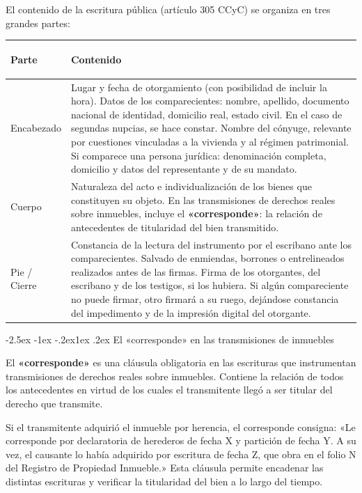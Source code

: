 \documentclass[12pt,oneside]{book}
\makeatletter
\renewcommand\subsection{\@startsection{subsection}{2}{\z@}%
  {-2.5ex \@plus -1ex \@minus -.2ex}{1ex \@plus .2ex}%
  {\normalfont\normalsize\bfseries}}
\makeatother
\begin{document}
El contenido de la escritura pública (artículo 305 CCyC) se organiza en tres grandes partes:

\begin{table}[H]
\centering
\begin{tabularx}{\textwidth}{>{\bfseries\raggedright\arraybackslash}p{}
                              >{\raggedright\arraybackslash}X}
\toprule
Parte & Contenido \\
\midrule
Encabezado & Lugar y fecha de otorgamiento (con posibilidad de incluir la hora). Datos de los comparecientes: nombre, apellido, documento nacional de identidad, domicilio real, estado civil. En el caso de segundas nupcias, se hace constar. Nombre del cónyuge, relevante por cuestiones vinculadas a la vivienda y al régimen patrimonial. Si comparece una persona jurídica: denominación completa, domicilio y datos del representante y de su mandato. \\[4pt]
Cuerpo & Naturaleza del acto e individualización de los bienes que constituyen su objeto. En las transmisiones de derechos reales sobre inmuebles, incluye el \textbf{«corresponde»}: la relación de antecedentes de titularidad del bien transmitido. \\[4pt]
Pie / Cierre & Constancia de la lectura del instrumento por el escribano ante los comparecientes. Salvado de enmiendas, borrones o entrelineados realizados antes de las firmas. Firma de los otorgantes, del escribano y de los testigos, si los hubiera. Si algún compareciente no puede firmar, otro firmará a su ruego, dejándose constancia del impedimento y de la impresión digital del otorgante. \\
\bottomrule
\end{tabularx}
\end{table}

\subsection{El «corresponde» en las transmisiones de inmuebles}

El \textbf{«corresponde»} es una cláusula obligatoria en las escrituras que instrumentan transmisiones de derechos reales sobre inmuebles. Contiene la relación de todos los antecedentes en virtud de los cuales el transmitente llegó a ser titular del derecho que transmite.

\begin{ejemplo}
Si el transmitente adquirió el inmueble por herencia, el corresponde consigna: «Le corresponde por declaratoria de herederos de fecha X y partición de fecha Y. A su vez, el causante lo había adquirido por escritura de fecha Z, que obra en el folio N del Registro de Propiedad Inmueble.» Esta cláusula permite encadenar las distintas escrituras y verificar la titularidad del bien a lo largo del tiempo.
\end{ejemplo}
\end{document}
